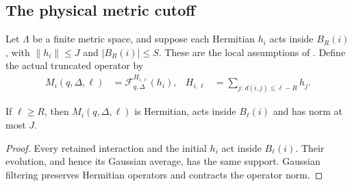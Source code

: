 \subsection{The physical metric cutoff}

Let $\Lambda$ be a finite metric space, and suppose each Hermitian $h_i$
acts inside $B_R(i)$, with $\|h_i\|\le J$ and $|B_R(i)|\le S$.
These are the local assumptions of
\cite[lines 169--190]{Hastings2006Solving}. Define the actual truncated
operator by
\begin{align}
    M_i(q,\Delta,\ell)
     & =\mathcal F_{q,\Delta}^{H_{i,\ell}}(h_i),
     & H_{i,\ell}                                & =\sum_{j:\,d(i,j)\le\ell-R}h_j.
    \label{eq:hastings05_metric_truncated_operator}
\end{align}

\begin{lemma}
    \label{thm:hastings05_metric_filter_properties}
    \leanok
    If $\ell\ge R$, then $M_i(q,\Delta,\ell)$ is Hermitian, acts inside
    $B_\ell(i)$ and has norm at most $J$.
\end{lemma}
\begin{proof}\leanok
    Every retained interaction and the initial $h_i$ act inside
    $B_\ell(i)$. Their evolution, and hence its Gaussian average, has the
    same support. Gaussian filtering preserves Hermitian operators and
    contracts the operator norm.
\end{proof}

